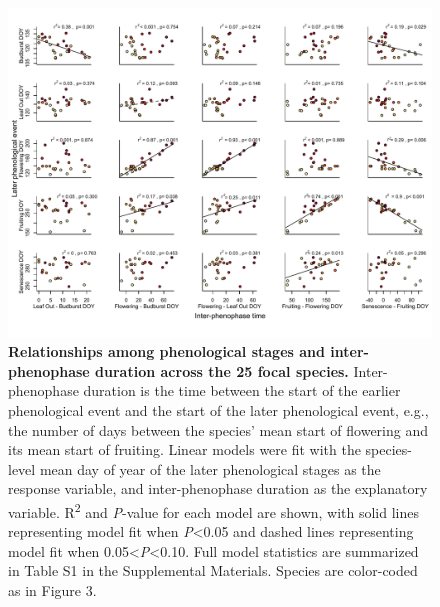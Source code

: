 \documentclass{article}
\begin{document}
\begin{figure}[h]
  \centering
  \includegraphics{../analyses/figures/adj_stagesmegaplot_col_YOR_ripefruit.pdf}
  \caption{\textbf{Relationships among phenological stages and inter-phenophase duration across the 25 focal species.} Inter-phenophase duration is the time between the start of the earlier phenological event and the start of the later phenological event, e.g., the number of days between the species' mean start of flowering and its mean start of fruiting. Linear models were fit with the species-level mean day of year of the later phenological stages as the response variable, and inter-phenophase duration as the explanatory variable. R\textsuperscript{2} and \textit{P}-value for each model are shown, with solid lines representing model fit when \textit{P}<0.05 and dashed lines representing model fit when 0.05<\textit{P}<0.10. Full model statistics are summarized in Table S1 in the Supplemental Materials. Species are color-coded as in Figure 3.}
  \label{fig:inter}
   \end{figure}


\end{document}
